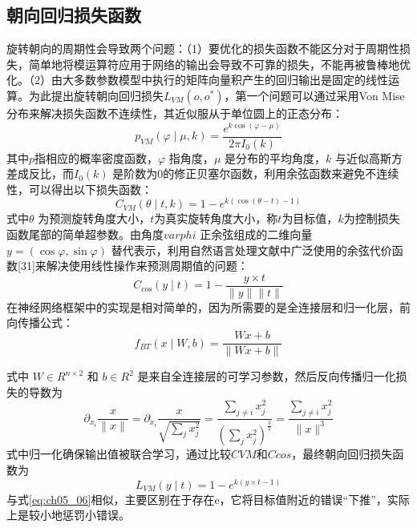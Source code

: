 \subsection{朝向回归损失函数}

旋转朝向的周期性会导致两个问题：（1）要优化的损失函数不能区分对于周期性损失，简单地将模运算符应用于网络的输出会导致不可靠的损失，不能再被鲁棒地优化。（2）由大多数参数模型中执行的矩阵向量积产生的回归输出是固定的线性运算。为此提出旋转朝向回归损失$L_{VM}(o,o^{*})$，第一个问题可以通过采用Von Mise 分布\citep{Beyer2015}来解决损失函数不连续性，其近似服从于单位圆上的正态分布：
\begin{equation} \label{eq:ch05_04}
      p_{VM}(\varphi \mid \mu,k)=\frac{e^{k \cos(\varphi-\mu)}}{2\pi I_{0}(k)}
\end{equation} 	                            	  					             
其中$p$指相应的概率密度函数，$\varphi$ 指角度，$\mu $ 是分布的平均角度，$k$ 与近似高斯方差成反比，而$I_{0}(k)$  是阶数为0的修正贝塞尔函数，利用余弦函数来避免不连续性，可以得出以下损失函数：
 \begin{equation} \label{eq:ch05_05}
      C_{VM}(\theta \mid t,k)= 1- e^{k (\cos(\theta-t)-1)}
\end{equation}         			                    
式中$\theta$ 为预测旋转角度大小，$t$为真实旋转角度大小，称$t$为目标值，$k$为控制损失函数尾部的简单超参数。由角度$varphi$ 正余弦组成的二维向量$y=(\cos\varphi,\sin\varphi)$ 替代表示，利用自然语言处理文献中广泛使用的余弦代价函数[31]来解决使用线性操作来预测周期值的问题：
\begin{equation} \label{eq:ch05_06}
     C_{\cos}(y \mid t)=1- \frac{y\times t}{\parallel y\parallel \parallel t\parallel}  
\end{equation}      					               
在神经网络框架中的实现是相对简单的，因为所需要的是全连接层和归一化层，前向传播公式：
\begin{equation} \label{eq:ch05_07}
      f_{BT}(x \mid W,b)=\frac{Wx+b}{\parallel Wx+b \parallel }
\end{equation}  
                     			                    	 
式中 $W\in R^{n\times 2}$ 和 $b\in R^{2}$ 是来自全连接层的可学习参数，然后反向传播归一化损失的导数为
\begin{equation} \label{eq:ch05_08}
      \partial _{x_{i}} \frac{x}{\parallel x\parallel}=\partial _{x_{i}}\frac{x }{\sqrt{\sum_{j}x_j^2}} =\frac{\sum_{j \neq 
 i}x_j^2 }{(\sum_{j}x_j^2)^{\frac{3}{2}}}  =\frac{\sum_{j \neq i}x_j^2 }{\parallel x\parallel^3} 
\end{equation} 	                 			    
式中归一化确保输出值被联合学习，通过比较$CVM$和$Ccos$，最终朝向回归损失函数为
\begin{equation} \label{eq:ch05_09}
      L_{VM}(y\mid t) = 1- e^{k (y\times t-1)}
\end{equation} 	                           								
与式\ref{eq:ch05_06}相似，主要区别在于存在e，它将目标值附近的错误“下推”，实际上是较小地惩罚小错误。

